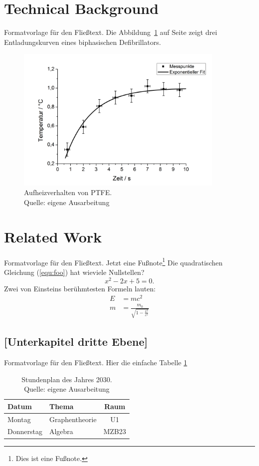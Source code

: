 \documentclass[a4paper,12pt,twoside]{scrreprt}
\begin{document}
\section{Technical Background}
Formatvorlage für den Fließtext. Die Abbildung~\ref{fig:ex} auf Seite \pageref{fig:ex} zeigt drei Entladungskurven eines biphasischen Defibrillators.
\begin{figure}[htb]
  \centering
  \includegraphics[width=10cm]{Abbildungen/Amann_TechnAbb}
  \caption[Aufheizverhalten von PTFE]{Aufheizverhalten von PTFE. \\Quelle: eigene Ausarbeitung}
 \label{fig:ex}
\end{figure}


\section{Related Work}
Formatvorlage für den Fließtext.
Jetzt eine Fußnote\footnote{Dies ist eine Fußnote.}
Die quadratischen Gleichung (\ref{equ:foo}) hat wieviele Nullstellen?
\begin{equation}
 \label{equ:foo}
 x^2-2x+5=0.
\end{equation}
Zwei von Einsteins berühmtesten Formeln lauten:
\begin{eqnarray*}
  E &= mc^2                                  \\
  m &= \frac{m_0}{\sqrt{1-\frac{v^2}{c^2}}}
\end{eqnarray*}


\subsection{[Unterkapitel dritte Ebene]}
Formatvorlage für den Fließtext. Hier die einfache Tabelle \ref{tab:sp}

\begin{table}[htb]
  \centering
  \begin{tabular}{ | l | l |c|}
    \hline
    Datum      & Thema           & Raum \\
    \hline\hline
    Montag     & Graphentheorie  & U1   \\
    \hline
    Donnerstag & Algebra         & MZB23\\
    \hline
  \end{tabular}
  \caption[Stundenplan]{Stundenplan des Jahres 2030.\\Quelle: eigene Ausarbeitung}
  \label{tab:sp}
\end{table}
\end{document}
